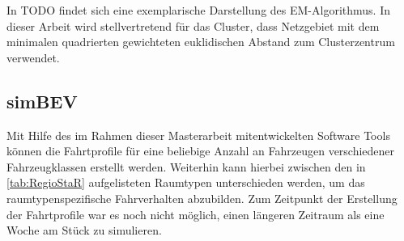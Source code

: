 
In {\color{red} TODO} findet sich eine exemplarische Darstellung des EM-Algorithmus.
In dieser Arbeit wird stellvertretend für das Cluster, dass Netzgebiet mit dem minimalen quadrierten gewichteten euklidischen Abstand zum Clusterzentrum verwendet.


\subsection{simBEV}\label{chap:simbev_theo}


Mit Hilfe des im Rahmen dieser Masterarbeit mitentwickelten Software Tools \simbev können die Fahrtprofile für eine beliebige Anzahl an Fahrzeugen verschiedener Fahrzeugklassen erstellt werden.
Weiterhin kann hierbei zwischen den in \autoref{tab:RegioStaR} aufgelisteten \Regiostar Raumtypen unterschieden werden, um das raumtypenspezifische Fahrverhalten abzubilden.
Zum Zeitpunkt der Erstellung der Fahrtprofile war es noch nicht möglich, einen längeren Zeitraum als eine Woche am Stück zu simulieren.



